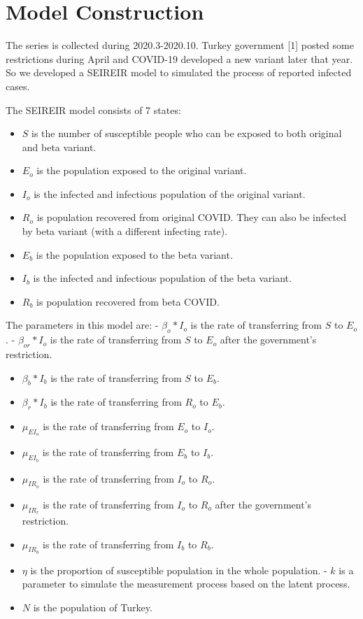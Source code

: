 \documentclass[
]{article}
\providecommand{\tightlist}{%
  \setlength{\itemsep}{0pt}\setlength{\parskip}{0pt}}
\begin{document}
\hypertarget{model-construction}{%
\section{Model Construction}\label{model-construction}}

The series is collected during 2020.3-2020.10. Turkey government {[}1{]}
posted some restrictions during April and COVID-19 developed a new
variant later that year. So we developed a SEIREIR model to simulated
the process of reported infected cases.

The SEIREIR model consists of 7 states:

\begin{itemize}
\tightlist
\item
  \(S\) is the number of susceptible people who can be exposed to both
  original and beta variant.
\item
  \(E_o\) is the population exposed to the original variant.
\item
  \(I_o\) is the infected and infectious population of the original
  variant.
\item
  \(R_o\) is population recovered from original COVID. They can also be
  infected by beta variant (with a different infecting rate).
\item
  \(E_b\) is the population exposed to the beta variant.
\item
  \(I_b\) is the infected and infectious population of the beta variant.
\item
  \(R_b\) is population recovered from beta COVID.
\end{itemize}

The parameters in this model are: - \(\beta_o*I_o\) is the rate of
transferring from \(S\) to \(E_o\). - \(\beta_{or}*I_o\) is the rate of
transferring from \(S\) to \(E_o\) after the government's restriction.

\begin{itemize}
\tightlist
\item
  \(\beta_b*I_b\) is the rate of transferring from \(S\) to \(E_b\).
\item
  \(\beta_r*I_b\) is the rate of transferring from \(R_o\) to \(E_b\).
\item
  \(\mu_{EI_o}\) is the rate of transferring from \(E_o\) to \(I_o\).
\item
  \(\mu_{EI_b}\) is the rate of transferring from \(E_b\) to \(I_b\).
\item
  \(\mu_{IR_o}\) is the rate of transferring from \(I_o\) to \(R_o\).
\item
  \(\mu_{IR_r}\) is the rate of transferring from \(I_o\) to \(R_o\)
  after the government's restriction.
\item
  \(\mu_{IR_b}\) is the rate of transferring from \(I_b\) to \(R_b\).
\item
  \(\eta\) is the proportion of susceptible population in the whole
  population. - \(k\) is a parameter to simulate the measurement process
  based on the latent process.
\item
  \(N\) is the population of Turkey.
\end{itemize}
\end{document}
